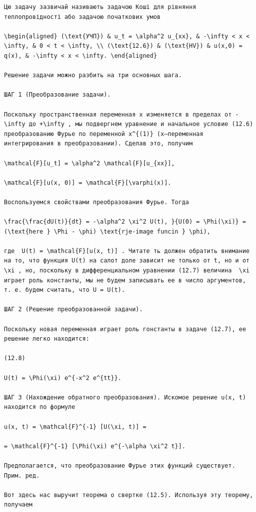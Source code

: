 \documentclass[
  ukrainian,
]{article}
\begin{document}
\begin{verbatim}
Цю задачу зазвичай називають задачою Коші для рівняння теплопровідності або задачою початкових умов

\begin{aligned} (\text{УЧП}) & u_t = \alpha^2 u_{xx}, & -\infty < x < \infty, & 0 < t < \infty, \\ (\text{12.6}) & (\text{HV}) & u(x,0) = q(x), & -\infty < x < \infty. \end{aligned}

Решение задачи можно разбить на три основных шага.

ШАГ 1 (Преобразование задачи).

Поскольку пространственная переменная x изменяется в пределах от -\infty до +\infty , мы подвергнем уравнение и начальное условие (12.6) преобразованию Фурье по переменной x^{(1)} (x—переменная интегрирования в преобразовании). Сделав это, получим

\mathcal{F}[u_t] = \alpha^2 \mathcal{F}[u_{xx}],

\mathcal{F}[u(x, 0)] = \mathcal{F}[\varphi(x)].

Воспользуемся свойствами преобразования Фурье. Тогда

\frac{\frac{dU(t)}{dt} = -\alpha^2 \xi^2 U(t), }{U(0) = \Phi(\xi)} = (\text{here } \Phi - \phi) \text{rje-image funcin } \phi),

где  U(t) = \mathcal{F}[u(x, t)] . Читате ть должен обратить внимание на то, что функция U(t) на салот доле зависит не только от t, но и от  \xi , но, поскольку в дифференциальном уравнении (12.7) величина  \xi  играет роль константы, мы не будем записывать ее в число аргументов, т. е. будем считать, что U = U(t).

ШАГ 2 (Решение преобразованной задачи).

Поскольку новая переменная играет роль гонстанты в задаче (12.7), ее решение легко находится:

(12.8)

U(t) = \Phi(\xi) e^{-x^2 e^{tt}}.

ШАГ 3 (Нахождение обратного преобразования). Искомое решение u(x, t) находится по формуле

u(x, t) = \mathcal{F}^{-1} [U(\xi, t)] =

= \mathcal{F}^{-1} [\Phi(\xi) e^{-\alpha \xi^2 t}].

Предполагается, что преобразование Фурье этих функций существует. Прим. ред.

Вот здесь нас выручит теорема о свертке (12.5). Используя эту теорему, получаем


\end{verbatim}
\end{document}
